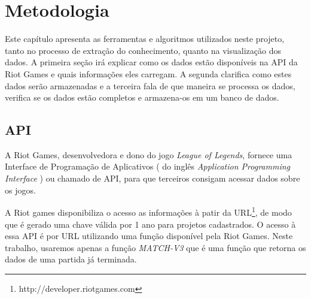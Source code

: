 \chapter{Metodologia}
Este capítulo apresenta as ferramentas e algoritmos utilizados neste projeto, tanto no processo de extração do conhecimento, quanto na visualização dos dados.
A primeira seção irá explicar como os dados estão disponíveis na API da Riot Games e quais informações eles carregam. A segunda clarifica como estes dados serão armazenadas e a terceira fala de que maneira se processa os dados, verifica se os dados estão completos e armazena-os em um banco de dados.

\section{API}
A Riot Games, desenvolvedora e dono do jogo \textit{League of Legends}, fornece uma Interface de Programação de Aplicativos ( do inglês \textit{Application Programming Interface} ) ou chamado de API, para que terceiros consigam acessar dados sobre os jogos.

A Riot games disponibiliza o acesso as informações à patir da URL\footnote{http://developer.riotgames.com}, de modo que é gerado uma chave válida por 1 ano para projetos cadastrados.
O acesso à essa API é por URL utilizando uma função disponível pela Riot Games. Neste trabalho, usaremos apenas a função \textit{MATCH-V3} que é uma função que retorna os dados de uma partida já terminada.

